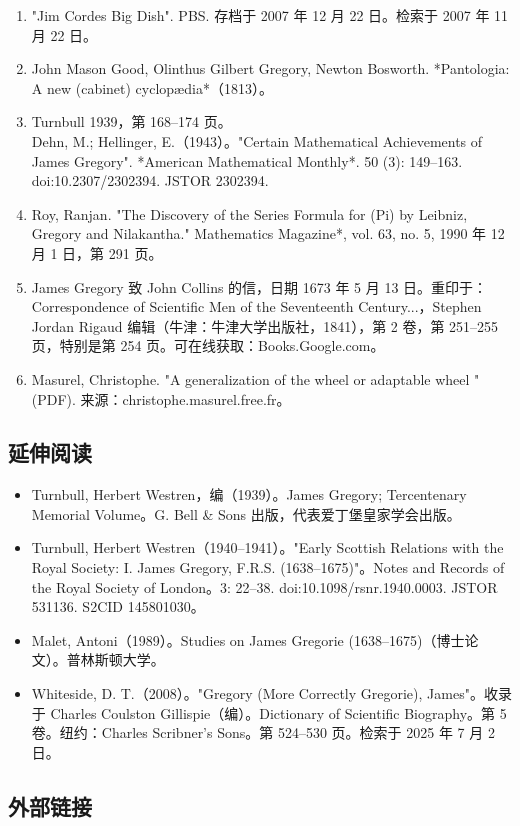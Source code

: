\begin{enumerate}
\item "Jim Cordes Big Dish". PBS. 存档于 2007 年 12 月 22 日。检索于 2007 年 11 月 22 日。
\item John Mason Good, Olinthus Gilbert Gregory, Newton Bosworth. *Pantologia: A new (cabinet) cyclopædia*（1813）。
\item Turnbull 1939，第 168–174 页。\\
Dehn, M.; Hellinger, E.（1943）。"Certain Mathematical Achievements of James Gregory". *American Mathematical Monthly*. 50 (3): 149–163. doi:10.2307/2302394. JSTOR 2302394.
\item Roy, Ranjan. "The Discovery of the Series Formula for (Pi) by Leibniz, Gregory and Nilakantha." Mathematics Magazine*, vol. 63, no. 5, 1990 年 12 月 1 日，第 291 页。
\item James Gregory 致 John Collins 的信，日期 1673 年 5 月 13 日。重印于：Correspondence of Scientific Men of the Seventeenth Century...，Stephen Jordan Rigaud 编辑（牛津：牛津大学出版社，1841），第 2 卷，第 251–255 页，特别是第 254 页。可在线获取：Books.Google.com。
\item Masurel, Christophe. "A generalization of the wheel or adaptable wheel " (PDF). 来源：christophe.masurel.free.fr。
\end{enumerate}
\subsection{延伸阅读}
\begin{itemize}
\item Turnbull, Herbert Westren，编（1939）。James Gregory; Tercentenary Memorial Volume。G. Bell & Sons 出版，代表爱丁堡皇家学会出版。
\item Turnbull, Herbert Westren（1940–1941）。"Early Scottish Relations with the Royal Society: I. James Gregory, F.R.S. (1638–1675)"。Notes and Records of the Royal Society of London。3: 22–38. doi:10.1098/rsnr.1940.0003. JSTOR 531136. S2CID 145801030。
\item Malet, Antoni（1989）。Studies on James Gregorie (1638–1675)（博士论文）。普林斯顿大学。
\item Whiteside, D. T.（2008）。"Gregory (More Correctly Gregorie), James"。收录于 Charles Coulston Gillispie（编）。Dictionary of Scientific Biography。第 5 卷。纽约：Charles Scribner's Sons。第 524–530 页。检索于 2025 年 7 月 2 日。
\end{itemize}
\subsection{外部链接}
